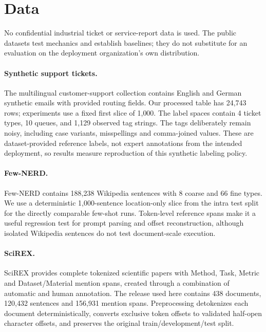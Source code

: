\section{Data}
\label{sec:data}

No confidential industrial ticket or service-report data is used. The public
datasets test mechanics and establish baselines; they do not substitute for an
evaluation on the deployment organization's own distribution.

\paragraph{Synthetic support tickets.}
The multilingual customer-support collection \citep{bueck2024tickets} contains
English and German synthetic emails with provided routing fields. Our processed
table has 24{,}743 rows; experiments use a fixed first slice of 1{,}000. The
label spaces contain 4 ticket types, 10 queues, and 1{,}129 observed tag strings.
The tags deliberately remain noisy, including case variants, misspellings and
comma-joined values. These are dataset-provided reference labels, not expert
annotations from the intended deployment, so results measure reproduction of
this synthetic labeling policy.

\paragraph{Few-NERD.}
Few-NERD \citep{ding2021fewnerd} contains 188{,}238 Wikipedia sentences with 8
coarse and 66 fine types. We use a deterministic 1{,}000-sentence location-only
slice from the intra test split for the directly comparable few-shot runs.
Token-level reference spans make it a useful regression test for prompt parsing
and offset reconstruction, although isolated Wikipedia sentences do not test
document-scale execution.

\paragraph{SciREX.}
SciREX \citep{jain2020scirex} provides complete tokenized scientific papers with
Method, Task, Metric and Dataset/Material mention spans, created through a
combination of automatic and human annotation. The release used here contains
438 documents, 120{,}432 sentences and 156{,}931 mention spans. Preprocessing
detokenizes each document deterministically, converts exclusive token offsets
to validated half-open character offsets, and preserves the original
train/development/test split.

